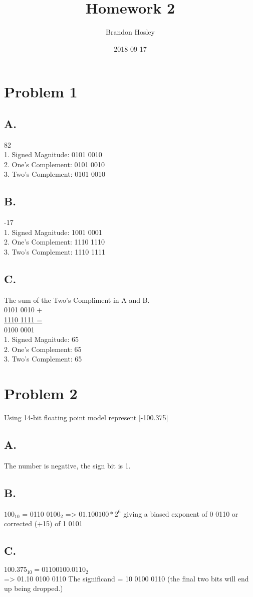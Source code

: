 \documentclass[a4paper,man,natbib]{apa6}
\title{Homework 2}
\author{Brandon Hosley}
\date{2018 09 17}
\affiliation{Mike Davis}
\begin{document}
\maketitle
\singlespacing

\section{Problem 1}
\subsection{A.} 82 \\
1. Signed Magnitude: 0101 0010 \\
2. One's Complement: 0101 0010 \\
3. Two's Complement: 0101 0010
\subsection{B.} -17 \\
1. Signed Magnitude: 1001 0001 \\
2. One's Complement: 1110 1110 \\
3. Two's Complement: 1110 1111
\subsection{C.} The sum of the Two's Compliment in A and B. \\
0101 0010 + \\
\underline{1110 1111 =} \\
0100 0001 \\
1. Signed Magnitude: 65 \\
2. One's Complement: 65 \\
3. Two's Complement: 65

\section{Problem 2}
Using 14-bit floating point model represent [-100.375]
\subsection{A.}
The number is negative, the sign bit is 1.
\subsection{B.}
$100_{10}$ = 0110 0100$_{2}$ => $01.10 0100*2^{6}$
giving a biased exponent of 0 0110 or corrected (+15) of 1 0101
\subsection{C.}
$100.375_{10} = 0110 0100.0110_{2}$ \\
=> 01.10 0100 0110
The significand = 10 0100 0110 (the final two bits will end up being dropped.)
\end{document}
